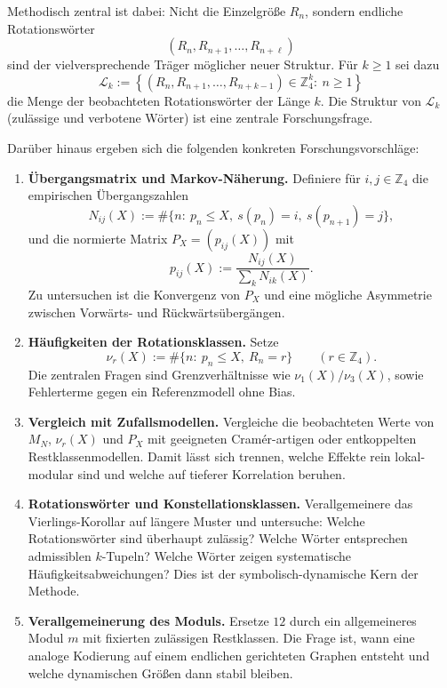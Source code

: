 \documentclass[11pt]{article}
\theoremstyle{definition}
\begin{document}
Methodisch zentral ist dabei:
Nicht die Einzelgr\"o{\ss}e $R_n$, sondern endliche Rotationsw\"orter
\[
(R_n,R_{n+1},\dots,R_{n+\ell})
\]
sind der vielversprechende Tr\"ager m\"oglicher neuer Struktur.
F\"ur $k\ge 1$ sei dazu
\[
\mathcal{L}_k
:=
\left\{
(R_n,R_{n+1},\dots,R_{n+k-1})\in\mathbb{Z}_4^k:\ n\ge 1
\right\}
\]
die Menge der beobachteten Rotationsw\"orter der L\"ange $k$.
Die Struktur von $\mathcal{L}_k$ (zul\"assige und verbotene W\"orter)
ist eine zentrale Forschungsfrage.

Dar\"uber hinaus ergeben sich die folgenden konkreten Forschungsvorschl\"age:
\begin{enumerate}[label=\textbf{F\arabic*:},leftmargin=*,itemsep=0.35em]
\item \textbf{\"Ubergangsmatrix und Markov-N\"aherung.}
Definiere f\"ur $i,j\in\mathbb{Z}_4$ die empirischen \"Ubergangszahlen
\[
N_{ij}(X):=\#\{n:\ p_n\le X,\ s(p_n)=i,\ s(p_{n+1})=j\},
\]
und die normierte Matrix $P_X=(p_{ij}(X))$ mit
\[
p_{ij}(X):=\frac{N_{ij}(X)}{\sum_{k}N_{ik}(X)}.
\]
Zu untersuchen ist die Konvergenz von $P_X$ und eine m\"ogliche Asymmetrie zwischen Vorw\"arts- und R\"uckw\"arts\"uberg\"angen.

\item \textbf{H\"aufigkeiten der Rotationsklassen.}
Setze
\[
\nu_r(X):=\#\{n:\ p_n\le X,\ R_n=r\}\qquad (r\in\mathbb{Z}_4).
\]
Die zentralen Fragen sind Grenzverh\"altnisse wie $\nu_1(X)/\nu_3(X)$, sowie Fehlerterme gegen ein Referenzmodell ohne Bias.

\item \textbf{Vergleich mit Zufallsmodellen.}
Vergleiche die beobachteten Werte von $M_N$, $\nu_r(X)$ und $P_X$ mit
geeigneten Cram\'er-artigen oder entkoppelten Restklassenmodellen.
Damit l\"asst sich trennen, welche Effekte rein lokal-modular sind und welche auf tieferer Korrelation beruhen.

\item \textbf{Rotationsw\"orter und Konstellationsklassen.}
Verallgemeinere das Vierlings-Korollar auf l\"angere Muster und untersuche:
Welche Rotationsw\"orter sind \"uberhaupt zul\"assig?
Welche W\"orter entsprechen admissiblen $k$-Tupeln?
Welche W\"orter zeigen systematische H\"aufigkeitsabweichungen?
Dies ist der symbolisch-dynamische Kern der Methode.

\item \textbf{Verallgemeinerung des Moduls.}
Ersetze $12$ durch ein allgemeineres Modul $m$ mit fixierten zul\"assigen Restklassen.
Die Frage ist, wann eine analoge Kodierung auf einem endlichen gerichteten Graphen
entsteht und welche dynamischen Gr\"o{\ss}en dann stabil bleiben.
\end{enumerate}
\end{document}
